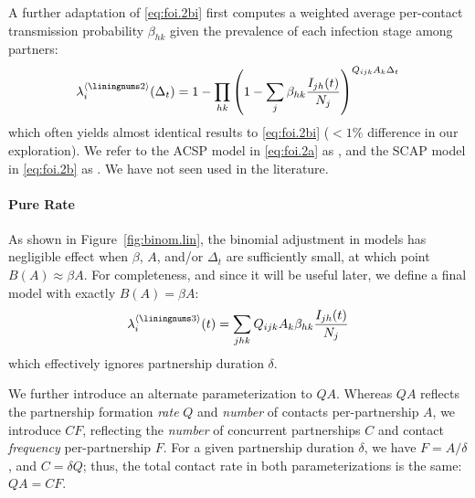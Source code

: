A further adaptation of \eqref{eq:foi.2bi} first computes
a weighted average per-contact transmission probability $\beta_{hk}$
given the prevalence of each infection stage among partners:
\begin{equation}\label{eq:foi.2b}
  \lambda_i^{\case{2}}(\Delta_t) =
  1 - \prod_{hk}{\left(1 - \sum_j \beta_{hk}\frac{I_{jh}(t)}{N_j}\right)}^{Q_{ijk} A_k \Delta_t}
\end{equation}
which often yields almost identical results to \eqref{eq:foi.2bi}
($<1\%$ difference in our exploration).
We refer to the ACSP model in \eqref{eq:foi.2a} as ,
and the SCAP model in \eqref{eq:foi.2b} as .
We have not seen  used in the literature.
\paragraph{ Pure Rate}
As shown in Figure~\ref{fig:binom.lin}, the binomial adjustment in models 
has negligible effect when $\beta$, $A$, and/or $\Delta_t$ are sufficiently small,
at which point $B(A) \approx \beta A$.
For completeness, and since it will be useful later,
we define a final model  with exactly $B(A) = \beta A$:
\begin{equation}\label{eq:foi.3}
  \lambda_i^{\case{3}}(t) = \sum_{jhk} Q_{ijk} A_k \beta_{hk} \frac{I_{jh}(t)}{N_j}
\end{equation}
which effectively ignores partnership duration $\delta$.
\par
We further introduce an alternate parameterization to $QA$.
Whereas $QA$ reflects the partnership formation \emph{rate} $Q$
and \emph{number} of contacts per-partnership $A$,
we introduce $CF$, reflecting the \emph{number} of concurrent partnerships $C$
and contact \emph{frequency} per-partnership $F$.
For a given partnership duration $\delta$, we have $F = A/\delta$, and $C = \delta Q$;
thus, the total contact rate in both parameterizations is the same: $QA = CF$.
